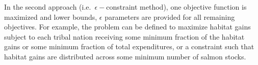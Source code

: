 \documentclass[12pt]{elsarticle}
\begin{document}
In the second approach (i.e.\ $\epsilon-$constraint method), one objective function is maximized and lower bounds, $\epsilon$ parameters are provided for all remaining objectives. For example, the problem can be defined to maximize habitat gains subject to each tribal nation receiving some minimum fraction of the habitat gains or some minimum fraction of total expenditures, or a constraint such that habitat gains are distributed across some minimum number of salmon stocks.


%
%
\end{document}

